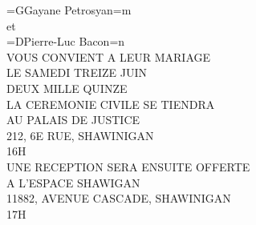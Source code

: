 \documentclass{letter}
\begin{document}
{\centering \carolyna\fontsize{36}{38}\selectfont =GGayane Petrosyan=m\\et\\=DPierre-Luc Bacon=n} \\

{\imfell \centering \normalsize \uppercase{Vous convient a leur mariage\\
\vspace{10mm}
le samedi treize juin\\
deux mille quinze\\
\vspace{10mm}
{\large la ceremonie civile se tiendra}\\
au Palais de Justice \\
212, 6e Rue, Shawinigan \\
16h\\
\vspace{10mm}
\large Une reception sera ensuite offerte\\
\normalsize a L'Espace Shawigan\\
11882, avenue Cascade, Shawinigan \\
17h\\

}}


\end{document}
